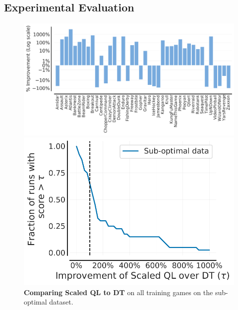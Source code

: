 \vspace{-0.2cm}
\subsection{Experimental Evaluation}
\label{sec:scaling_exps}
\vspace{-0.2cm}

\begin{figure}[t]
    \centering
    \begin{minipage}{0.65\linewidth}
 \includegraphics[width=\linewidth]{chapters/scaled_ql/figures/percent_improvement_over_DT.pdf}
    \end{minipage}
    \hfill
    \begin{minipage}{0.34\linewidth}
    \vspace{-0.2cm}
 \includegraphics[width=\linewidth]{chapters/scaled_ql/figures/pp_profile_ql_dt.pdf}
    \end{minipage}
    \vspace{-0.4cm}
    \caption{\textbf{Comparing Scaled QL to DT} on all training games on the sub-optimal dataset.}
    \label{fig:percent_improvement}
    \vspace{-0.5cm}
\end{figure}

